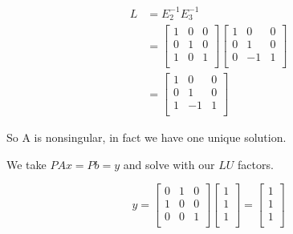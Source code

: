 \documentclass[12pt,letterpaper]{article}
\begin{document}
\begin{enumerate}
\begin{enumerate}
\begin{itemize}
              \begin{align*}
                L &= E_2^{-1}E_3^{-1} \\
                &=
                \begin{bmatrix}
                   1 &  0 &  0 \\
                   0 &  1 &  0 \\
                   1 &  0 &  1 \\
                \end{bmatrix}
                \begin{bmatrix}
                   1 &  0 &  0 \\
                   0 &  1 &  0 \\
                   0 & -1 &  1 \\
                \end{bmatrix}
                \\
                &=
                \begin{bmatrix}
                   1 &  0 &  0 \\
                   0 &  1 &  0 \\
                   1 & -1 &  1 \\
                \end{bmatrix}
              \end{align*}

              So A is nonsingular, in fact we have one unique solution.

              We take $PAx = Pb = y$ and solve with our $LU$ factors.

              \[
                y
                =
                \begin{bmatrix}
                   0 &  1 &  0 \\
                   1 &  0 &  0 \\
                   0 &  0 &  1 \\
                \end{bmatrix}
                \begin{bmatrix}
                   1 \\
                   1 \\
                   1 \\
                \end{bmatrix}
                =
                \begin{bmatrix}
                   1 \\
                   1 \\
                   1 \\
                \end{bmatrix}
              \]


\end{itemize}
\end{enumerate}
\end{enumerate}
\end{document}
